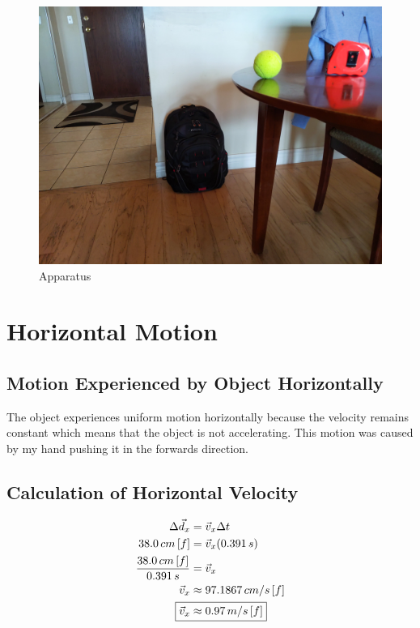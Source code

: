 \documentclass[12pt]{article}
\numberwithin{equation}{section}
\begin{document}
\begin{figure}[H]
	\centering
	\includegraphics[scale=0.11]{data-collection/apparatus.jpg}
	\caption{Apparatus}
	\label{fig:apparatus}
\end{figure}

\section{Horizontal Motion}

\subsection{Motion Experienced by Object Horizontally}

The object experiences uniform motion horizontally because the velocity remains constant which means that the object is not accelerating. This motion was caused by my hand pushing it in the forwards direction.

\subsection{Calculation of Horizontal Velocity}

\begin{align}
\Delta\vec{d}_x&=\vec{v}_x\Delta{t}\\
38.0\,cm\,[f]&=\vec{v}_x(0.391\,s)\\
\frac{38.0\,cm\,[f]}{0.391\,s}&=\vec{v}_x\\
\vec{v}_x&\approx97.1867\,cm/s\,[f]\\
\Aboxed{\vec{v}_x&\approx0.97\,m/s\,[f]}
\end{align}
\end{document}
